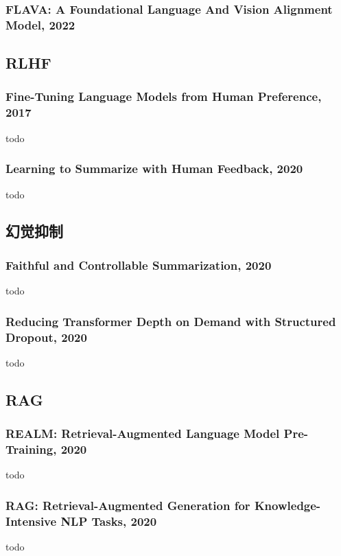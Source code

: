 \documentclass[twocolumn, 10pt]{article} %
\begin{document}
\subsubsection{FLAVA: A Foundational Language And Vision Alignment Model, 2022}











\subsection{RLHF}
\subsubsection{Fine-Tuning Language Models from Human Preference, 2017}
todo


\subsubsection{Learning to Summarize with Human Feedback, 2020}
todo


\subsection{幻觉抑制}
\subsubsection{Faithful and Controllable Summarization, 2020}
todo

\subsubsection{Reducing Transformer Depth on Demand with Structured Dropout, 2020}
todo


\subsection{RAG}
\subsubsection{REALM: Retrieval-Augmented Language Model Pre-Training, 2020}
todo
\subsubsection{RAG: Retrieval-Augmented Generation for Knowledge-Intensive NLP Tasks, 2020}
todo
\end{document}
